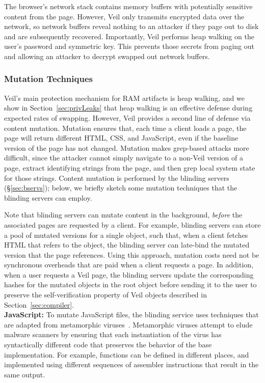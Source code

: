 The browser's network stack contains memory
buffers with potentially sensitive content
from the page. However, Veil only transmits
encrypted data over the network, so network
buffers reveal nothing to an attacker if
they page out to disk and are subsequently
recovered. Importantly, Veil performs
heap walking on the user's password and
symmetric key. This prevents those secrets
from paging out and allowing an attacker
to decrypt swapped out network buffers.

\subsubsection{Mutation Techniques}
\label{sec:mutation}
Veil's main protection mechanism for RAM
artifacts is heap walking, and we show in
Section~\ref{sec:privLeaks} that heap walking
is an effective defense during expected rates
of swapping. However, Veil provides a second
line of defense via content mutation. Mutation
ensures that, each time a client loads a page,
the page will return different HTML, CSS, and
JavaScript, even if the baseline version of the
page has not changed. Mutation makes grep-based
attacks more difficult, since the attacker
cannot simply navigate to a non-Veil version
of a page, extract identifying strings from the
page, and then grep local system state for those
strings. Content mutation is performed by the
blinding servers (\S\ref{sec:bservs}); below,
we briefly sketch some mutation techniques
that the blinding servers can employ.

Note that blinding servers can mutate content
in the background, \textit{before} the associated
pages are requested by a client. For example,
blinding servers can store a pool of mutated
versions for a single object, such that, when
a client fetches HTML that refers to the
object, the blinding server can late-bind
the mutated version that the page references.
Using this approach, mutation costs need not
be synchronous overheads that are paid when
a client requests a page. In addition, 
when a user requests a Veil page,
the blinding servers update the corresponding 
hashes for the mutated objects in the root object
before sending it to the user
to preserve the self-verification property of 
Veil objects described in Section~\ref{sec:compiler}. \\

\noindent
{\bf JavaScript:} To mutate JavaScript files, the
blinding service uses techniques that are adapted
from metamorphic viruses~\cite{hunting06}. Metamorphic
viruses attempt to elude malware scanners by
ensuring that each instantiation of the virus has
syntactically different code that preserves the
behavior of the base implementation. For example,
functions can be defined in different places, and
implemented using different sequences of assembler
instructions that result in the same output.

